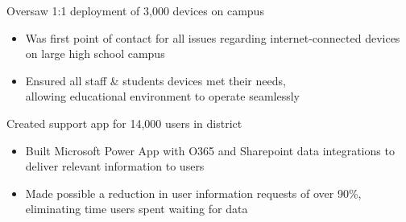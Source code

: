 \documentclass[10pt,a4paper,ragged2e,landscape]{altacv}
\begin{document}

\marginpar{}
\makecvheader

\setlength{\columnsep}{0.5cm}

\par\smallskip
\begin{minipage}[]{13.75cm}
  \begin{minipage}{6.5cm}
    Oversaw 1:1 deployment of 3,000 devices on campus
    \begin{itemize}
      \item Was first point of contact for all issues regarding internet-connected devices
            on large high school campus
      \item Ensured all staff \& students devices met their needs,\\allowing educational
            environment to operate seamlessly
    \end{itemize}
  \end{minipage}
  \hfill
  \begin{minipage}{6.5cm}
    Created support app for 14,000 users in district
    \begin{itemize}
      \item Built Microsoft Power App with O365 and Sharepoint data integrations to deliver
            relevant information to users
      \item Made possible a reduction in user information requests of over 90\%,
            eliminating time users spent waiting for data

    \end{itemize}
  \end{minipage}
\end{minipage}
\par\smallskip
\divider
\end{document}
